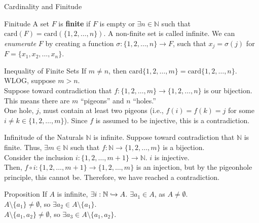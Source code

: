 \documentclass[10pt]{extarticle}
\begin{document}
\begin{problem}{Cardinality and Finitude}
    \begin{problem}{Finitude}
      A set $F$ is \textbf{finite} if $F$ is empty or $\exists n\in \mathbb{N}$ such that $\text{card}(F) = \text{card}\left(\{1,2,\dots,n\}\right)$. A non-finite set is called infinite.
      \tcblower
      We can \textsl{enumerate} $F$ by creating a function $\sigma: \{1,2,\dots,n\}\rightarrow F$, such that $x_j = \sigma(j)$ for $F = \{x_1,x_2,\dots,x_n\}$.
    \end{problem}
    \begin{problem}{Inequality of Finite Sets}
      If $m\neq n$, then $\text{card}\{1,2,\dots,m\} = \text{card}\{1,2,\dots,n\}$.
      \tcblower
      WLOG, suppose $m>n$.\\

      Suppose toward contradiction that $f: \{1,2,\dots,m\} \rightarrow \{1,2,\dots,n\}$ is our bijection. This means there are $m$ ``pigeons'' and $n$ ``holes.''\\

      One hole, $j$, must contain at least two pigeons (i.e., $f(i) = f(k) = j$ for some $i\neq k\in \{1,2,\dots,m\}$). Since $f$ is assumed to be injective, this is a contradiction.
    \end{problem}
    \begin{problem}{Infinitude of the Naturals}
      $\mathbb{N}$ is infinite.
      \tcblower
      Suppose toward contradiction that $\mathbb{N}$ is finite. Thus, $\exists m\in \mathbb{N}$ such that $f:\mathbb{N} \rightarrow \{1,2,\dots,m\}$ is a bijection.\\

      Consider the inclusion $i: \{1,2,\dots,m+1\}\rightarrow \mathbb{N}$. $i$ is injective.\\

      Then, $f\circ i: \{1,2,\dots,m+1\} \rightarrow \{1,2,\dots,m\}$ is an injection, but by the pigeonhole principle, this cannot be. Therefore, we have reached a contradiction.
    \end{problem}
    \begin{problem}{Proposition}
      If $A$ is infinite, $\exists i: \mathbb{N} \xhookrightarrow{} A$.
      \tcblower
      $\exists a_1\in A$, as $A\neq \emptyset$.\\

      $A\setminus \{a_1\} \neq \emptyset$, so $\exists a_2 \in A\setminus \{a_1\}$.\\

      $A \setminus \{a_1,a_2\} \neq \emptyset$, so $\exists a_3\in A\setminus \{a_1,a_2\}$.\\


\end{problem}
\end{problem}
\end{document}
